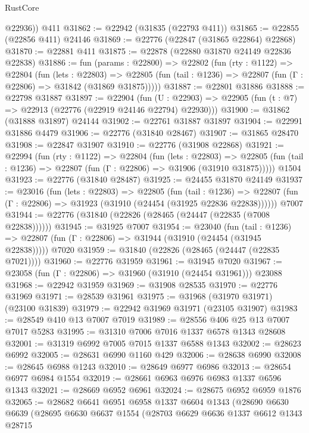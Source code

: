 \begin{lexlean}{RustCore}
\begin{coremodule}
        @22936))
    @411
@31862 := @22942 (@31835 (@22793 @411))
@31865 := @22855 (@22856 @411) @24146
@31869 := @22776 (@22847 (@31865 @22864) @22868)
@31870 := @22881 @411
@31875 := @22878 (@22880 @31870 @24149 @22836 @22838)
@31886 := fun (params : @22800) =>
  @22802
    (fun (rty : @1122) =>
    @22804
      (fun (lets : @22803) =>
      @22805 (fun (tail : @1236) => @22807 (fun (Γ : @22806) => @31842 (@31869 @31875)))))
@31887 := @22801 @31886
@31888 := @22798 @31887
@31897 := @22904
    (fun (U : @22903) => @22905 (fun (t : @7) => @22913 (@22776 (@22919 @24146 @22794) @22930)))
@31900 := @31862 (@31888 @31897) @24144
@31902 := @22761 @31887 @31897
@31904 := @22991 @31886 @4479
@31906 := @22776 (@31840 @28467)
@31907 := @31865 @28470
@31908 := @22847 @31907
@31910 := @22776 (@31908 @22868)
@31921 := @22994
    (fun (rty : @1122) =>
    @22804
      (fun (lets : @22803) =>
      @22805 (fun (tail : @1236) => @22807 (fun (Γ : @22806) => @31906 (@31910 @31875)))))
    @1504
@31923 := @22776 (@31840 @28487)
@31925 := @24455 @31870 @24149
@31937 := @23016
    (fun (lets : @22803) =>
    @22805
      (fun (tail : @1236) =>
      @22807 (fun (Γ : @22806) => @31923 (@31910 (@24454 (@31925 @22836 @22838))))))
    @7007
@31944 := @22776 (@31840 (@22826 (@28465 (@24447 (@22835 (@7008 @22838))))))
@31945 := @31925 @7007
@31954 := @23040
    (fun (tail : @1236) => @22807 (fun (Γ : @22806) => @31944 (@31910 (@24454 (@31945 @22838)))))
    @7020
@31959 := @31840 (@22826 (@28465 (@24447 (@22835 @7021))))
@31960 := @22776 @31959
@31961 := @31945 @7020
@31967 := @23058 (fun (Γ : @22806) => @31960 (@31910 (@24454 @31961))) @23088
@31968 := @22942 @31959
@31969 := @31908 @28535
@31970 := @22776 @31969
@31971 := @28539 @31961
@31975 := @31968 (@31970 @31971) (@23100 @31839)
@31979 := @22942 @31969 @31971 (@23105 @31907)
@31983 := @28549 @410 @13 @7007 @7019
@31989 := @28556 @406 @25 @13 @7007 @7017 @5283
@31995 := @31310 @7006 @7016 @1337 @6578 @1343 @28608
@32001 := @31319 @6992 @7005 @7015 @1337 @6588 @1343
@32002 := @28623 @6992
@32005 := @28631 @6990 @1160 @429
@32006 := @28638 @6990
@32008 := @28645 @6988 @1243
@32010 := @28649 @6977 @6986
@32013 := @28654 @6977 @6984 @1554
@32019 := @28661 @6963 @6976 @6983 @1337 @6596 @1343
@32021 := @28669 @6952 @6961
@32024 := @28675 @6952 @6959 @1876
@32065 := @28682
    @6641
    @6951
    @6958
    @1337
    @6604
    @1343
    (@28690
      @6630
      @6639
      (@28695
        @6630
        @6637
        @1554
        (@28703
          @6629
          @6636
          @1337
          @6612
          @1343
          @28715

\end{coremodule}
\end{lexlean}
